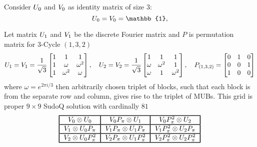 \documentclass[11pt]{article}
\begin{document}
\begin{example}
Consider $\mathnormal{U}_0$ and $\mathnormal{V}_0$ as identity matrix of size $3$: 
\[
\mathnormal{U}_0=\mathnormal{V}_0=\mathbb{1},
\]

Let matrix $\mathnormal{U}_1$ and $\mathnormal{V}_1$ be the discrete Fourier matrix and $P$ is permutation matrix for $3$-Cycle $(1,3,2)$
\[
\mathnormal{U}_1=\mathnormal{V}_1=
\frac{1}{\sqrt{3}}
\begin{bmatrix}
    1 & 1 & 1 \\
    1 & \omega & \omega^2 \\
    1 & \omega^2 & \omega
\end{bmatrix},
    \quad    
    \mathnormal{U}_2=\mathnormal{V}_2=
\frac{1}{\sqrt{3}}
\begin{bmatrix}
    1 & 1 & 1 \\
    \omega & \omega^2 & 1 \\
    \omega & 1 & \omega^2
\end{bmatrix}, 
    \quad
P_{(1,3,2)} = 
\begin{bmatrix}
    0 & 1 & 0 \\
    0 & 0 & 1 \\
    1 & 0 & 0
\end{bmatrix}
\]
where $\omega=e^{2\pi i/3}$ then arbitrarily chosen triplet of blocks, such that each block is from the separate row and column, gives rise to the triplet of MUBs.
This grid is proper $9\times9$ SudoQ solution with cardinally $81$
\[
\begin{tabular}{!{\vrule width 1pt}c!{\vrule width 1pt}c!{\vrule width 1pt}c!{\vrule width 1pt}c!{\vrule width 1pt}c!{\vrule width 1pt}}
    \noalign{\hrule height 1pt}
    $\mathnormal{V}_0\otimes\mathnormal{U}_0$ & $\mathnormal{V}_0\mathnormal{P}_\pi\otimes\mathnormal{U}_1$ & $\mathnormal{V}_0\mathnormal{P}_\pi^2\otimes\mathnormal{U}_2$ \tabularnewline
    \noalign{\hrule height 1pt}
    $\mathnormal{V}_1\otimes\mathnormal{U}_0\mathnormal{P}_\pi$ & $\mathnormal{V}_1\mathnormal{P}_\pi\otimes\mathnormal{U}_1\mathnormal{P}_\pi$ & $\mathnormal{V}_1\mathnormal{P}_\pi^2\otimes\mathnormal{U}_2\mathnormal{P}_\pi$ \tabularnewline
    \noalign{\hrule height 1pt}
    $\mathnormal{V}_2\otimes\mathnormal{U}_0\mathnormal{P}_\pi^2$ & $\mathnormal{V}_2\mathnormal{P}_\pi\otimes\mathnormal{U}_1\mathnormal{P}_\pi^2$ & $\mathnormal{V}_2\mathnormal{P}_\pi^2\otimes\mathnormal{U}_2\mathnormal{P}_\pi^2$ \tabularnewline
    \noalign{\hrule height 1pt}
    \end{tabular}
\]

\end{example}

\printbibliography
\end{document}
